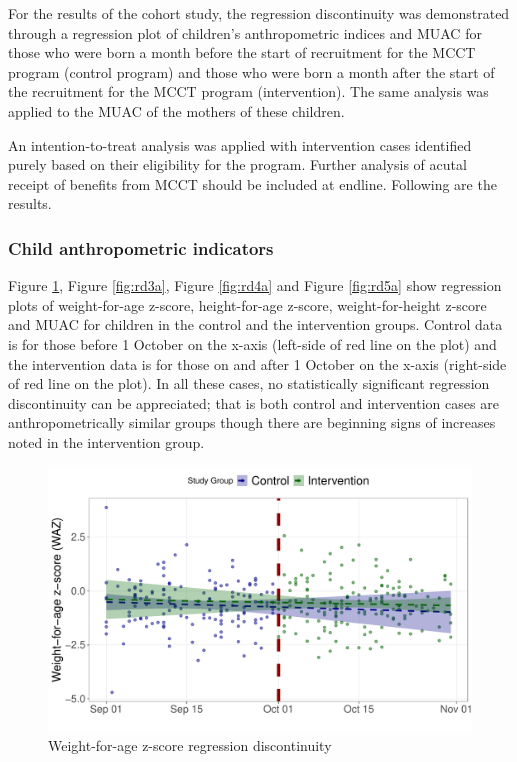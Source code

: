 \documentclass[12pt,a4paper]{article}
\begin{document}
For the results of the cohort study, the regression discontinuity was demonstrated through a regression plot of children's anthropometric indices and MUAC for those who were born a month before the start of recruitment for the MCCT program (control program) and those who were born a month after the start of the recruitment for the MCCT program (intervention). The same analysis was applied to the MUAC of the mothers of these children.

An intention-to-treat analysis was applied with intervention cases identified purely based on their eligibility for the program. Further analysis of acutal receipt of benefits from MCCT should be included at endline. Following are the results.

\hypertarget{child-anthropometric-indicators}{%
\subsubsection{Child anthropometric indicators}\label{child-anthropometric-indicators}}

Figure \ref{fig:rd2a}, Figure \ref{fig:rd3a}, Figure \ref{fig:rd4a} and Figure \ref{fig:rd5a} show regression plots of weight-for-age z-score, height-for-age z-score, weight-for-height z-score and MUAC for children in the control and the intervention groups. Control data is for those before 1 October on the x-axis (left-side of red line on the plot) and the intervention data is for those on and after 1 October on the x-axis (right-side of red line on the plot). In all these cases, no statistically significant regression discontinuity can be appreciated; that is both control and intervention cases are anthropometrically similar groups though there are beginning signs of increases noted in the intervention group.

\begin{figure}[H]

{\centering \includegraphics{kayahReport_files/figure-latex/rd2a-1} 

}

\caption{Weight-for-age z-score regression discontinuity}\label{fig:rd2a}
\end{figure}
\end{document}
